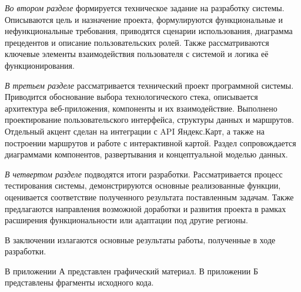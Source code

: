 \emph{Во втором разделе} формируется техническое задание на разработку системы. Описываются цель и назначение проекта, формулируются функциональные и нефункциональные требования, приводятся сценарии использования, диаграмма прецедентов и описание пользовательских ролей. Также рассматриваются ключевые элементы взаимодействия пользователя с системой и логика её функционирования.

\emph{В третьем разделе} рассматривается технический проект программной системы. Приводится обоснование выбора технологического стека, описывается архитектура веб-приложения, компоненты и их взаимодействие. Выполнено проектирование пользовательского интерфейса, структуры данных и маршрутов. Отдельный акцент сделан на интеграции с API Яндекс.Карт, а также на построении маршрутов и работе с интерактивной картой. Раздел сопровождается диаграммами компонентов, развертывания и концептуальной моделью данных.

\emph{В четвертом разделе} подводятся итоги разработки. Рассматривается процесс тестирования системы, демонстрируются основные реализованные функции, оценивается соответствие полученного результата поставленным задачам. Также предлагаются направления возможной доработки и развития проекта в рамках расширения функциональности или адаптации под другие регионы.

В заключении излагаются основные результаты работы, полученные в ходе разработки.

В приложении А представлен графический материал.
В приложении Б представлены фрагменты исходного кода. 
